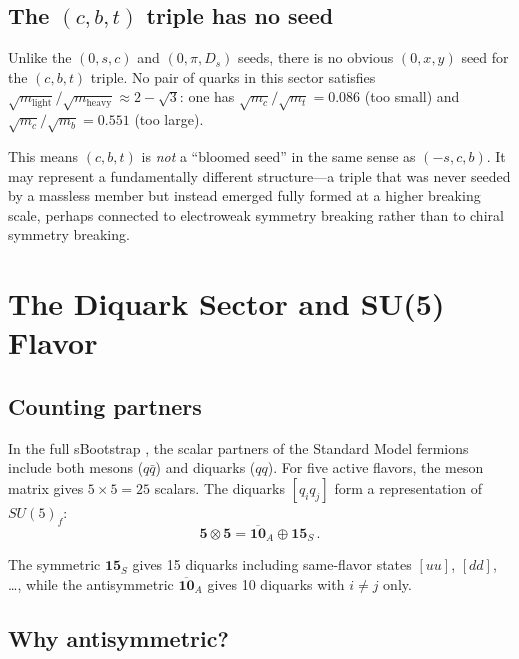 \documentclass[12pt,a4paper]{article}
\begin{document}
\subsection{The $(c,b,t)$ triple has no seed}

Unlike the $(0,s,c)$ and $(0,\pi,D_s)$ seeds, there is no obvious 
$(0, x, y)$ seed for the $(c,b,t)$ triple. No pair of quarks in this 
sector satisfies $\sqrt{m_{\text{light}}}/\sqrt{m_{\text{heavy}}} 
\approx 2 - \sqrt{3}$: one has $\sqrt{m_c}/\sqrt{m_t} = 0.086$ 
(too small) and $\sqrt{m_c}/\sqrt{m_b} = 0.551$ (too large).

This means $(c,b,t)$ is \emph{not} a ``bloomed seed'' in the same 
sense as $(-s,c,b)$. It may represent a fundamentally different 
structure---a triple that was never seeded by a massless member but 
instead emerged fully formed at a higher breaking scale, perhaps 
connected to electroweak symmetry breaking rather than to chiral 
symmetry breaking.

\section{The Diquark Sector and SU(5) Flavor}
\label{sec:diquarks}

\subsection{Counting partners}

In the full sBootstrap \cite{Rivero2005}, the scalar partners of 
the Standard Model fermions include both mesons ($q\bar{q}$) and 
diquarks ($qq$). For five active flavors, the meson matrix gives 
$5 \times 5 = 25$ scalars. The diquarks $[q_i q_j]$ form a 
representation of $SU(5)_f$:
\begin{equation}
\mathbf{5} \otimes \mathbf{5} = \overline{\mathbf{10}}_A 
\oplus \mathbf{15}_S\,.
\end{equation}

The symmetric $\mathbf{15}_S$ gives 15 diquarks including 
same-flavor states $[uu]$, $[dd]$, \ldots, while the antisymmetric 
$\overline{\mathbf{10}}_A$ gives 10 diquarks with $i \neq j$ only.

\subsection{Why antisymmetric?}
\end{document}
